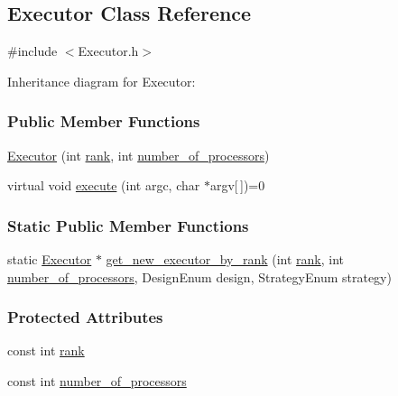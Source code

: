 \hypertarget{a00015}{}\subsection{Executor Class Reference}
\label{a00015}


{\ttfamily \#include $<$Executor.\+h$>$}



Inheritance diagram for Executor\+:
\subsubsection*{Public Member Functions}
\begin{DoxyCompactItemize}
\item 
\hyperlink{a00015_ad0a052ec3c021786fed3c8d336ab0659}{Executor} (int \hyperlink{a00015_a33c24e2887b4d9c4ef7f3566d3bc803e}{rank}, int \hyperlink{a00015_a4e798bde66d26fe200de7e8d2b54e915}{number\+\_\+of\+\_\+processors})
\item 
virtual void \hyperlink{a00015_aabad4923751a6ea70ca536d4d1f2f32a}{execute} (int argc, char $\ast$argv\mbox{[}$\,$\mbox{]})=0
\end{DoxyCompactItemize}
\subsubsection*{Static Public Member Functions}
\begin{DoxyCompactItemize}
\item 
static \hyperlink{a00015}{Executor} $\ast$ \hyperlink{a00015_ab193432d6f64407c45780629e3341a87}{get\+\_\+new\+\_\+executor\+\_\+by\+\_\+rank} (int \hyperlink{a00015_a33c24e2887b4d9c4ef7f3566d3bc803e}{rank}, int \hyperlink{a00015_a4e798bde66d26fe200de7e8d2b54e915}{number\+\_\+of\+\_\+processors}, Design\+Enum design, Strategy\+Enum strategy)
\end{DoxyCompactItemize}
\subsubsection*{Protected Attributes}
\begin{DoxyCompactItemize}
\item 
const int \hyperlink{a00015_a33c24e2887b4d9c4ef7f3566d3bc803e}{rank}
\item 
const int \hyperlink{a00015_a4e798bde66d26fe200de7e8d2b54e915}{number\+\_\+of\+\_\+processors}
\end{DoxyCompactItemize}


